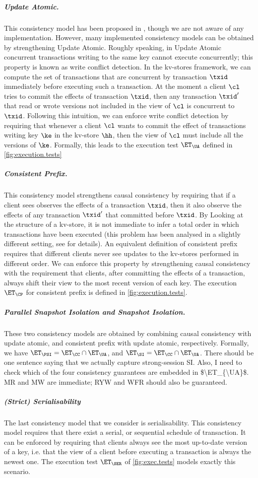 \subparagraph{Update Atomic.} 
This consistency model has been proposed in \cite{framework-concur}, though we 
are not aware of any implementation. However, many implemented consistency models 
can be obtained by strengthening Update Atomic. Roughly speaking, in Update Atomic 
concurrent transactions writing to the same key cannot execute concurrently; this property 
is known as write conflict detection. In the kv-stores 
framework, we can compute the set of transactions that are concurrent by transaction $\txid$ 
immediately before executing such a transaction. At the moment a client $\cl$ tries to 
commit the effects of transaction $\txid$, then any transaction $\txid'$ that read or wrote versions not included 
in the view of $\cl$ is concurrent to $\txid$. Following this intuition, we can enforce write 
conflict detection by requiring that whenever a client $\cl$ wants to commit the effect of 
transactions writing key $\ke$ in the kv-store $\hh$, then the view of $\cl$ must include all the versions of $\ke$. 
Formally, this leads to the execution test $\ET_{\UA}$ defined in \cref{fig:execution.tests}

\subparagraph{Consistent Prefix.}
This consistency model strengthens causal consistency by requiring that if a client 
sees observes the effects of a transaction $\txid$, then it also observe the effects 
of any transaction $\txid'$ that committed before $\txid$. By Looking at the structure 
of a kv-store, it is not immediate to infer a total order in which transactions have been 
executed (this problem has been analysed in a slightly different setting, see \cite{SIanalysis,laws} 
for details). An equivalent definition of consistent prefix requires that different clients 
never see updates to the kv-stores performed in different order. We can enforce this property 
by strengthening causal consistency with the requirement that clients, 
after committing the effects of a transaction, always shift their view to 
the most recent version of each key.  The execution $\ET_{\CP}$ for consistent 
prefix is defined in \cref{fig:execution.tests}.

\subparagraph{Parallel Snapshot Isolation and Snapshot Isolation.} 
These two consistency models are obtained by combining causal consistency with update atomic, 
and consistent prefix with update atomic, respectively. Formally, we have 
$\ET_{\PSI} = \ET_{\CC} \cap \ET_{\UA}$, and $\ET_{\SI} = \ET_{\CC} \cap \ET_{\UA}$.
\ac{There should be one sentence saying that we actually capture strong-session SI. 
Also, I need to check which of the four consistency guarantees are embedded in $\ET_{\UA}$. 
MR and MW are immediate; RYW and WFR should also be guaranteed.}

\subparagraph{(Strict) Serialisability}
The last consistency model that we consider is serialisability. This consistency model 
requires that there exist a serial, or sequential schedule of transaction. It can be 
enforced by requiring that clients always see the most up-to-date version of a key, 
i.e. that the view of a client before executing a transaction is always the newest one. 
The execution test $\ET_{\SER}$ of \cref{fig:exec.tests} models exactly this scenario.